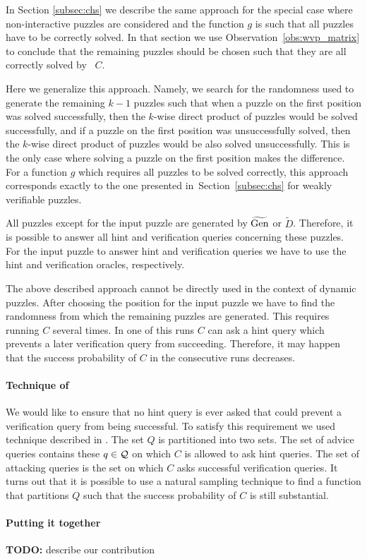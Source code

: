 In Section \ref{subsec:chs} we describe the same approach for the special case where
non-interactive puzzles are considered and the function $g$ is such that all puzzles have to be correctly solved.
In that section we use Observation~\ref{obs:wvp_matrix} to conclude that the remaining puzzles should be chosen such that they
are all correctly solved by~ $C$.

Here we generalize this approach. Namely, we search for the randomness used to generate the remaining $k\!-\!1$ puzzles
such that when a puzzle on the first position was solved successfully, then the $k$-wise direct product of puzzles would be solved successfully,
and if a puzzle on the first position was unsuccessfully solved, then the $k$-wise direct product of puzzles would be also solved unsuccessfully.
This is the only case where solving a puzzle on the first position makes the difference.
For a function $g$ which requires all puzzles to be solved correctly,
this approach corresponds exactly to the one presented in~Section~\ref{subsec:chs} for weakly verifiable puzzles.

All puzzles except for the input puzzle are generated by $\widetilde{\operatorname{\text{Gen}}}$ or $\widetilde{D}$.
Therefore, it is possible to answer all hint and verification queries concerning these puzzles.
For the input puzzle to answer hint and verification queries we have to use the hint and verification oracles, respectively.

The above described approach cannot be directly used in the context of dynamic puzzles.
After choosing the position for the input puzzle we have to find the randomness from which the remaining puzzles are generated.
This requires running $C$ several times. In one of this runs $C$ can ask a hint query which prevents a later verification query from succeeding.
Therefore, it may happen that the success probability of $C$ in the consecutive runs decreases.

\paragraph{Technique of \cite{dodis2009security}}
We would like to ensure that no hint query is ever asked that could prevent a verification query from being successful.
To satisfy this requirement we used technique described in \cite{dodis2009security}.
The set $Q$ is partitioned into two sets. The set of advice queries contains these $q \in \mathcal{Q}$ on which
$C$ is allowed to ask hint queries. The set of attacking queries is the set on which $C$ asks successful verification queries.
It turns out that it is possible to use a natural sampling technique to find a function that partitions $Q$ such that
the success probability of $C$ is still substantial.

\paragraph{Putting it together}
\begin{todo}
  \textbf{TODO:} describe our contribution
\end{todo}